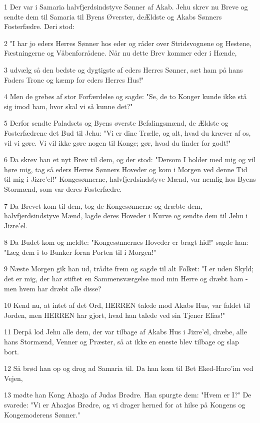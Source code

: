 \par 1 Der var i Samaria halvfjerdsindstyve Sønner af Akab. Jehu skrev nu Breve og sendte dem til Samaria til Byens Øverster, deÆldste og Akabs Sønners Fosterfædre. Deri stod:
\par 2 "I har jo eders Herres Sønner hos eder og råder over Stridsvognene og Hestene, Fæstningerne og Våbenforrådene. Når nu dette Brev kommer eder i Hænde,
\par 3 udvælg så den bedste og dygtigste af eders Herres Sønner, sæt ham på hans Faders Trone og kæmp for eders Herres Hus!"
\par 4 Men de grebes af stor Forfærdelse og sagde: "Se, de to Konger kunde ikke stå sig imod ham, hvor skal vi så kunne det?"
\par 5 Derfor sendte Paladsets og Byens øverste Befalingsmænd, de Ældste og Fosterfædrene det Bud til Jehu: "Vi er dine Trælle, og alt, hvad du kræver af os, vil vi gøre. Vi vil ikke gøre nogen til Konge; gør, hvad du finder for godt!"
\par 6 Da skrev han et nyt Brev til dem, og der stod: "Dersom I holder med mig og vil høre mig, tag så eders Herres Sønners Hoveder og kom i Morgen ved denne Tid til mig i Jizre'el!" Kongesønnerne, halvfjerdsindstyve Mænd, var nemlig hos Byens Stormænd, som var deres Fosterfædre.
\par 7 Da Brevet kom til dem, tog de Kongesønnerne og dræbte dem, halvfjerdsindstyve Mænd, lagde deres Hoveder i Kurve og sendte dem til Jehu i Jizre'el.
\par 8 Da Budet kom og meldte: "Kongesønnernes Hoveder er bragt hid!" sagde han: "Læg dem i to Bunker foran Porten til i Morgen!"
\par 9 Næste Morgen gik han ud, trådte frem og sagde til alt Folket: "I er uden Skyld; det er mig, der har stiftet en Sammensværgelse mod min Herre og dræbt ham - men hvem har dræbt alle disse?
\par 10 Kend nu, at intet af det Ord, HERREN talede mod Akabs Hus, var faldet til Jorden, men HERREN har gjort, hvad han talede ved sin Tjener Elias!"
\par 11 Derpå lod Jehu alle dem, der var tilbage af Akabs Hus i Jizre'el, dræbe, alle hans Stormænd, Venner og Præster, så at ikke en eneste blev tilbage og slap bort.
\par 12 Så brød han op og drog ad Samaria til. Da han kom til Bet Eked-Haro'im ved Vejen,
\par 13 mødte han Kong Ahazja af Judas Brødre. Han spurgte dem: "Hvem er I?" De svarede: "Vi er Ahazjas Brødre, og vi drager herned for at hilse på Kongens og Kongemoderens Sønner."
